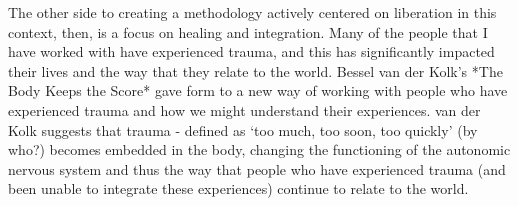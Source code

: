 The other side to creating a methodology actively centered on liberation in this context, then, is a focus on healing and integration. Many of the people that I have worked with have experienced trauma, and this has significantly impacted their lives and the way that they relate to the world. Bessel van der Kolk’s *The Body Keeps the Score* gave form to a new way of working with people who have experienced trauma and how we might understand their experiences. van der Kolk suggests that trauma - defined as ‘too much, too soon, too quickly’ (by who?) becomes embedded in the body, changing the functioning of the autonomic nervous system and thus the way that people who have experienced trauma (and been unable to integrate these experiences) continue to relate to the world. 































